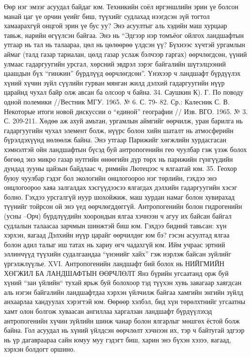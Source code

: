 Өөр нэг эмзэг асуудал байдаг юм. Техникийн соёл иргэншлийн эрин үе болсон манай цаг үе орчин үеийг биш, түүхийг судлахад нээгдсэн зүй тогтол хамаарахгүй онцгой эрин үе бус уу? Энэ асуултыг аль хэдийн маш хурцаар тавьж, нарийн өгүүлсэн байгаа. Энэ нь “Эдгээр нэр томъёог ойлгох ландшафтын утгаар нь тал нь талаараа, цөл нь цөлөөрөө үлдсэн үү? Бүхнээс хүчтэй ургамлын аймаг (талд газар тариалан, цөлд газар услаж бэлчээр гаргах) өөрчлөгдсөн, үүний улмаас гадаргуугийн урсгал, хөрсний эвдрэл зэрэг байгалийн шүтэлцээний цаашдын бүх “гинжин” бүрдлүүд өөрчлөгдсөн”. Үнэхээр ч ландшафт бүрдүүлэх хүний хүчин зүйл сүүлийн гурван мянган жилд дэлхий гадаргуугийн нүүр царайнд чухал байр олж авсан ба олсоор ч байна. 34. Саушкин К). Г. По поводу одной полемики //Вестник МГУ. 1965. № 6. С. 79- 82. Ср.: Калесник С. В. Некоторые итоги новой дискуссии о “единой” географии // Изв. ВГО. 1965. № 3. С. 209-211.
Хөдөө аж ахуй амьтан, ургамлын аймгийг өөрчилж, уран барилга нь гадаргуугийн чухал элемент болж, нүүрс болон хийн шаталт нь атмосферийн бүрэлдэхүүнд нөлөөлж байна. Энэ утгаар Парижийг хөгжлийн хурдасгасан хэмнэлтэй ойн ландшафтын бүсэд буй антропогенийн гео чуулбар гэж үзэж болох бөгөөд энэ микро газар нутгийн өнөөгийн дүр төрх нь парижийн гүнгүүдийн дундад зууны цайзын байдлаас ч, римийн Лютецээс ч ялгаатай юм. 35. Геохор буюу чуулбар гэдэг бол экологийн онцлогоороо нэг төрлийн, гэхдээ энэ онцлогоороо хаяа залгалдах хэсгүүдээсээ ялгагдах дэлхийн гадаргуугийн хэсэг болно.
Гэхдээ урсгалгүй нуур шохойжиж, маш хурдан намаг болон хувирахад түүнийг тойрсон ой энэ үед өөрчлөгддөггүй. Антропогенийн болон гидрогенийн (усны –Орч) бүрдлүүдийн хоорондын ялгаа хэчнээн ч агуу их байсан байгал судлалын талаасаа зарчмын шинжтэй биш юм. Гэхдээ бидний тавьсан: хүн хэрхэн, яагаад Дэлхийн нүүр царайг өөрчилдөг юм бэ? гэсэн асуултад ялгаа болон адил талыг иш татах нь хариу өгч чадахгүй юм. Ийм учраас эртний эллинчүүд түүхийн судалгаандаа “үнэнийг хайх” гэж нэрлэж байсан зүйлийг үргэлжлүүлье.
XVI. Антропогенийн ландшафт бий болох нь
НИЙГМИЙН ХӨГЖИЛ БА ЛАНДШАФТЫН ӨӨРЧЛӨЛТ
Янз бүрийн угсаатанд орж буй хүний “зан үйлийн“ тухай ярьж буй болохоор тэд түүхэн хувь заяагаар хаягдсан аль нэгэн байгалийн ландшафтдаа хэрхэн үйлчилж байгаа хамгийн энгийн зүйлд анхаарлаа хандуулах хэрэгтэй юм. Өөрөөр хэлбэл, бид хүн төрөлхтнийг угсаатны хамт олон болгож хуваасан ангиллаа харгалзан ландшафт бүрдүүлэхэд антропогенийн хүчин зүйлийн шинж чанар болон ялгарлыг мөшгөх ёстой болж байна.
Гол асуудал нь хүний үйлдсэн өөрчлөлт хэчнээн их, тэр ч байтугай эдгээр нь үр дагавраараа сайн юмуу муу гэдэгт биш, харин энэ бүхэн хэзээ, яагаад, хэрхэн болдогт оршино.
